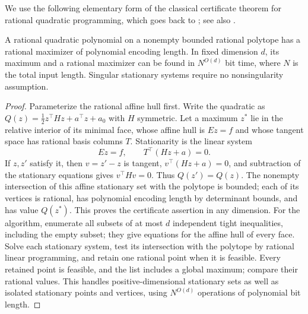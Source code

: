 We use the following elementary form of the classical certificate theorem
for rational quadratic programming, which goes back to
\citet{vavasis1990-qp-np}; see also
\citet[Section 2.2, Theorem 3]{delpia2017-miqp-np}.
\begin{lemma}
\label{lem:a-weight-qp}
A rational quadratic polynomial on a nonempty bounded rational polytope
has a rational maximizer of polynomial encoding length. In fixed dimension
$d$, its maximum and a rational maximizer can be found in $N^{O(d)}$ bit
time, where $N$ is the total input length. Singular stationary systems
require no nonsingularity assumption.
\end{lemma}
\begin{proof}
Parameterize the rational affine hull first. Write the quadratic as
$Q(z)=\tfrac12z^\top Hz+a^\top z+a_0$ with $H$ symmetric.
Let a maximum $z^*$ lie in the relative interior of its minimal face,
whose affine hull is $Ez=f$ and whose tangent space has rational basis
columns $T$. Stationarity is the linear system
\[
 Ez=f,\qquad T^\top(Hz+a)=0.
\]
If $z,z'$ satisfy it, then $v=z'-z$ is tangent,
$v^\top(Hz+a)=0$, and subtraction of the stationary equations gives
$v^\top Hv=0$. Thus $Q(z')=Q(z)$. The nonempty intersection of this
affine stationary set with the polytope is bounded; each of its vertices
is rational, has polynomial encoding length by determinant bounds, and
has value $Q(z^*)$. This proves the certificate assertion in any dimension.
For the algorithm, enumerate all subsets of at most $d$ independent tight
inequalities, including the empty subset; they give equations for the
affine hull of every face. Solve each stationary system, test its
intersection with the polytope by rational linear programming, and retain
one rational point when it is feasible. Every retained point is feasible,
and the list includes a global maximum; compare their rational values.
This handles positive-dimensional stationary sets as well as isolated
stationary points and vertices, using $N^{O(d)}$ operations of polynomial
bit length.
\end{proof}

